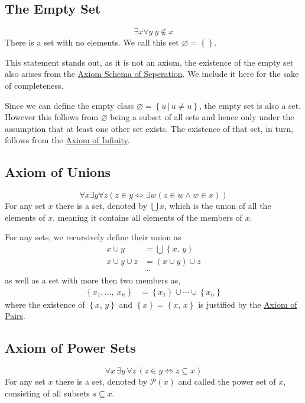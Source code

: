 \documentclass[../../main.tex]{subfiles}
\begin{document}
\subsection{The Empty Set}\label{ZF4}
$$\exists x \forall y \ y \notin x$$
There is a set with no elements. We call this set $\varnothing = \left\{\right\}$. \cite{Gol17}

This statement stands out, as it is not an axiom, the existence of the empty set also arises from the \hyperref[ZF3]{Axiom Schema of Seperation}.
We include it here for the sake of completeness.

Since we can define the empty class $\varnothing = \left\{u\, \vert\, u \neq u\right\}$, the empty set is also a set.
However this follows from $\varnothing$ being a subset of all sets and hence only under the assumption that at least one other set exists.
The existence of that set, in turn, follows from the \hyperref[ZF7]{Axiom of Infinity}.\cite[p.6]{Jec78}

\subsection{Axiom of Unions}\label{ZF5}
$$\forall x \exists y \forall z \left(z \in y \iff \exists w \left(z \in w \wedge w \in x\right)\right)$$
For any set $x$ there is a set, denoted by $\bigcup x$, which is the union of all the elements of $x$.
meaning it contains all elements of the members of $x$.

For any sets, we recursively define their union as
\begin{align*}
    x \cup y &= \bigcup \left\{x,\, y\right\} \\
    x \cup y \cup z &= \left(x \cup y\right) \cup z \\
    &\cdots
\end{align*}
as well as a set with more then two members as,
\begin{align*}
    \left\{x_1,\ldots,\ x_n\right\} &= \left\{x_1\right\} \cup \cdots \cup \left\{x_n\right\}
\end{align*}
where the existence of $\left\{x,\, y\right\}$ and $\left\{x\right\} = \left\{x,\, x\right\}$ is justified by the \hyperref[ZF2]{Axiom of Pairs}. \cite[p.6]{Jec78}

\subsection{Axiom of Power Sets}\label{ZF6}
$$\forall x\, \exists y\, \forall z\, \left(z \in y \iff z \subseteq x\right)$$
For any set $x$ there is a set, denoted by $\mathcal{P}(x)$ and called the power set of $x$, consisting of all subsets $s \subseteq x$.
\end{document}
